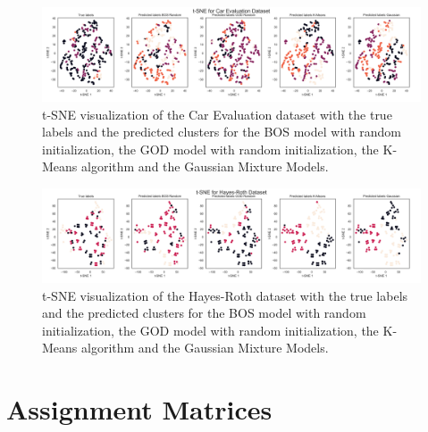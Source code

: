 \documentclass[a4paper,12pt]{article}
\begin{document}
\begin{figure}[H]
    \centering
    \includegraphics[width=\textwidth]{Attachments/tsne_car_evaluation.png}
    \caption{t-SNE visualization of the Car Evaluation dataset with the true labels and the predicted clusters for the BOS model with random initialization, the GOD model with random initialization, the K-Means algorithm and the Gaussian Mixture Models.}
    \label{fig:tsne_car}
\end{figure}

\begin{figure}[H]
    \centering
    \includegraphics[width=\textwidth]{Attachments/tsne_hayes-roth.png}
    \caption{t-SNE visualization of the Hayes-Roth dataset with the true labels and the predicted clusters for the BOS model with random initialization, the GOD model with random initialization, the K-Means algorithm and the Gaussian Mixture Models.}
    \label{fig:tsne_hr}
\end{figure}


\section{Assignment Matrices}
\label{sec:appendix_assign}
\end{document}
